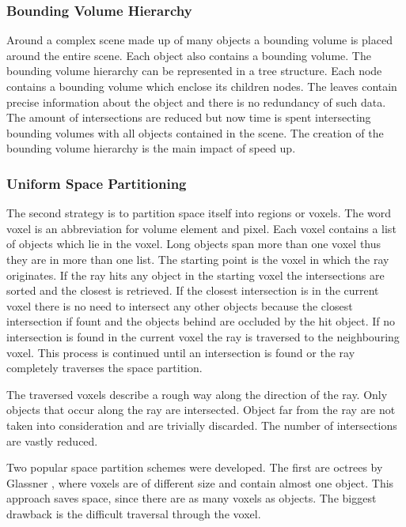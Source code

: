 \documentclass[DIV10, abstracton, openright, footsepline, headsepline, twoside, 9pt,
bigheadings]{scrreprt}
\begin{document}
\subsubsection{Bounding Volume Hierarchy}
Around a complex scene made up of many objects a bounding volume is placed
around the entire scene. Each object also contains a bounding volume. The
bounding volume hierarchy can be represented in a tree structure. Each node
contains a bounding volume which enclose its children nodes. The leaves contain
precise information about the object and there is no redundancy of such data.
The amount of intersections are reduced but now time is spent intersecting
bounding volumes with all objects contained in the scene. The creation of the
bounding volume hierarchy is the main impact of speed up.

\subsubsection{Uniform Space Partitioning}
\label{sec:uniform_space}
The second strategy is to partition space itself into regions or voxels. The
word voxel is an abbreviation for volume element and pixel. Each voxel contains
a list of objects which lie in the voxel. Long objects span more than one voxel
thus they are in more than one list. The starting point is the voxel in which
the ray originates. If the ray hits any object in the starting voxel the
intersections are sorted and the closest is retrieved. If the closest
intersection is in the current voxel there is no need to intersect any other
objects because the closest intersection if fount and the objects behind
are occluded by the hit object. If no intersection is found in the current voxel
the ray is traversed to the neighbouring voxel. This process is continued until
an intersection is found or the ray completely traverses the space partition.

The traversed voxels describe a rough way along the direction of the ray. Only
objects that occur along the ray are intersected. Object far from the ray are
not taken into consideration and are trivially discarded. The number of
intersections are vastly reduced.

Two popular space partition schemes were developed. The first are octrees by
Glassner \cite{octrees}, where voxels are of different size and contain almost
one object. This approach saves space, since there are as many voxels as
objects. The biggest drawback is the difficult traversal through the voxel.
\end{document}
